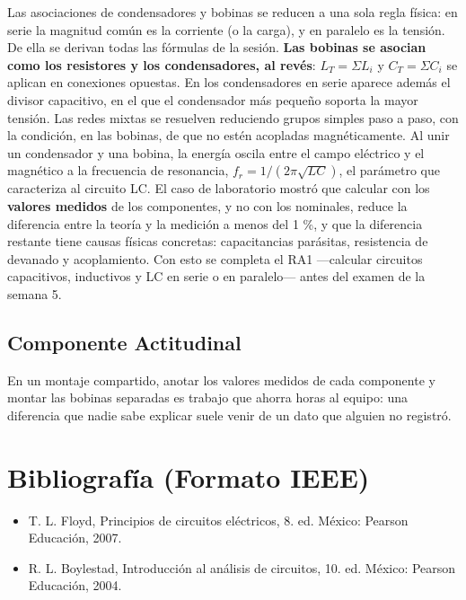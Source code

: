 \documentclass[11pt,letterpaper]{article}
\begin{document}
Las asociaciones de condensadores y bobinas se reducen a una sola regla física: en serie la magnitud común es la corriente (o la carga), y en paralelo es la tensión. De ella se derivan todas las fórmulas de la sesión. \textbf{Las bobinas se asocian como los resistores y los condensadores, al revés}: $L_T = \Sigma L_i$ y $C_T = \Sigma C_i$ se aplican en conexiones opuestas. En los condensadores en serie aparece además el divisor capacitivo, en el que el condensador más pequeño soporta la mayor tensión. Las redes mixtas se resuelven reduciendo grupos simples paso a paso, con la condición, en las bobinas, de que no estén acopladas magnéticamente. Al unir un condensador y una bobina, la energía oscila entre el campo eléctrico y el magnético a la frecuencia de resonancia, $f_r = 1/(2\pi\sqrt{LC})$, el parámetro que caracteriza al circuito LC. El caso de laboratorio mostró que calcular con los \textbf{valores medidos} de los componentes, y no con los nominales, reduce la diferencia entre la teoría y la medición a menos del 1 \%, y que la diferencia restante tiene causas físicas concretas: capacitancias parásitas, resistencia de devanado y acoplamiento. Con esto se completa el RA1 ---calcular circuitos capacitivos, inductivos y LC en serie o en paralelo--- antes del examen de la semana 5.

\subsection*{Componente Actitudinal}

\begin{cita}
En un montaje compartido, anotar los valores medidos de cada componente y montar las bobinas separadas es trabajo que ahorra horas al equipo: una diferencia que nadie sabe explicar suele venir de un dato que alguien no registró.
\end{cita}

\section{Bibliografía (Formato IEEE)}

{\sloppy
\begin{itemize}[leftmargin=2.6em, labelwidth=2.2em, labelsep=0.4em, align=left]
  \item[{[1]}] T. L. Floyd, Principios de circuitos eléctricos, 8.\textordfeminine{} ed. México: Pearson Educación, 2007.
  \item[{[2]}] R. L. Boylestad, Introducción al análisis de circuitos, 10.\textordfeminine{} ed. México: Pearson Educación, 2004.
\end{itemize}
}
\end{document}
